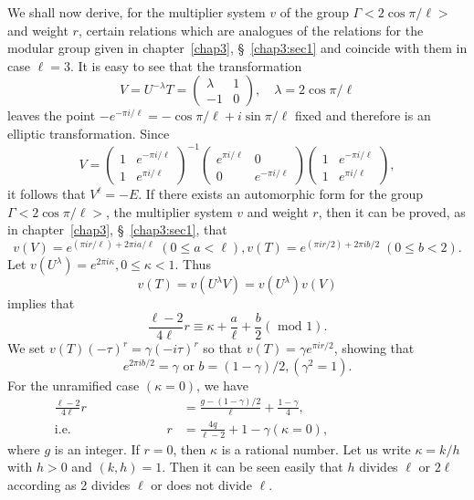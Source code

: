 We shall now derive, for the multiplier system $v$ of the group
$\Gamma<2\cos \pi/\ell>$ and weight $r$, certain relations which are
analogues of the relations for the modular group given in 
chapter~\ref{chap3}, \S~\ref{chap3:sec1} and coincide with 
them in case $\ell=3$. It is easy to see that the  transformation
$$
V=U^{-\lambda} T=\begin{pmatrix}
\lambda & 1\\
-1 & 0
\end{pmatrix}, \quad \lambda = 2 \cos \pi/\ell
$$
leaves the point $-e^{-\pi i/\ell} = -\cos \pi/\ell+i\sin \pi/\ell$
fixed and therefore is an elliptic transformation. Since
$$
V= \begin{pmatrix}
1 & e^{-\pi i/\ell}\\
1 & e^{\pi i/\ell}
\end{pmatrix}^{-1} \begin{pmatrix}
e^{\pi i/\ell} & 0\\
0 & e^{-\pi i/\ell}
\end{pmatrix} \begin{pmatrix}
1 & e^{-\pi i/\ell}\\
1 & e^{\pi i /\ell}
\end{pmatrix},
$$
it follows that $V^{\ell} =-E$. If there exists an automorphic form
for the group $\Gamma<2\cos \pi /\ell>$, the multiplier system $v$ and
weight $r$, then it can be proved, as in chapter~\ref{chap3}, 
\S~\ref{chap3:sec1}, that
$$
v(V) = e^{(\pi i r/\ell)+2\pi i a/\ell} \; (0\leq a < \ell), v(T) =
e^{(\pi i r/2)+2\pi i b/2} \; (0\leq b < 2).
$$
Let $v(U^{\lambda}) =e^{2\pi i \kappa}, 0\leq \kappa <1$. Thus 
$$
v(T) = v(U^{\lambda}V) = v(U^{\lambda})v(V)
$$
implies that
$$
\frac{\ell-2}{4\ell} r \equiv\kappa+\frac{a}{\ell} + \frac{b}{2}(\text{ mod }
1). 
$$\pageoriginale 
We set $v(T)(-\tau)^r=\gamma(-i\tau)^r$ so that $v(T)=\gamma e^{\pi i
  r/2}$, showing that 
$$
e^{2\pi i b/2} = \gamma \text{ or } b = (1-\gamma)/2, (\gamma^2=1).
$$
For the unramified case $(\kappa=0)$, we have 
\begin{align*}
\frac{\ell-2}{4\ell} r & = \frac{g-(1-\gamma)/2}{\ell}  +
\frac{1-\gamma}{4},\\
\text{i.e. } \hspace{3cm} r & = \frac{4q}{\ell-2} + 1 -\gamma
(\kappa=0), \hspace{3cm}
\end{align*}
where $g$ is an integer. If $r=0$, then $\kappa$ is a rational
number. Let us write $\kappa=k/h$ with $h>0$ and $(k,h)=1$. Then it
can be seen easily that $h$ divides $\ell$ or $2\ell$ according as 2
divides $\ell$ or does not divide $\ell$. 

